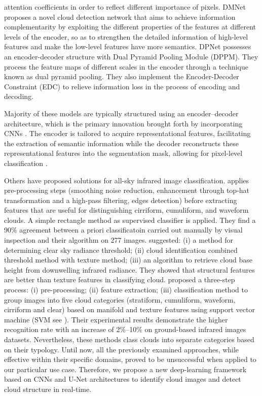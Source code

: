 \documentclass[amt, article]{copernicus}
\begin{document}
attention coefficients in order to reflect different importance of pixels. DMNet \citep{DMNet} proposes a novel cloud detection network that aims to achieve information complementarity by exploiting the different properties of the features at different levels of the encoder, so as to strengthen the detailed information of high-level features and make the low-level features have more semantics. DPNet \citep{DPNet} possesses an encoder-decoder structure with Dual Pyramid Pooling Module (DPPM). They process the feature maps of different scales in the encoder through a technique known as dual pyramid pooling. They also implement the Encoder-Decoder Constraint (EDC) to relieve information loss in the process of encoding and decoding.

Majority of these models are typically structured using an encoder–decoder architecture, which is the primary innovation brought forth by incorporating CNNs \citep{oshea2015introduction}. The encoder is tailored to acquire representational features, facilitating the extraction of semantic information while the decoder reconstructs these representational features into the segmentation mask, allowing for pixel-level classification \citep{badrinarayanan2017segnet, Alzubaidi2021ReviewOD}.

Others have proposed solutions for all-sky infrared image classification.
\citet{Liu2021} applies pre-processing steps (smoothing noise reduction, enhancement through top-hat transformation and a high-pass filtering, edges detection) before extracting features that are useful for distinguishing cirriform, cumuliform, and waveform clouds. A simple rectangle method as supervised classifier is applied. They find a 90\% agreement between a priori classificatoin carried out manually by visual inspection and their algorithm on 277 images. \citet{SUN2011278} suggested: (i) a method for determining clear sky radiance threshold; (ii) cloud identification combined threshold method with texture method; (iii) an algorithm to retrieve cloud base height from downwelling infrared radiance. They showed that structural features are better than texture features in classifying cloud. \citet{amt-11-5351-2018} proposed a three-step process: (i) pre-processing; (ii) feature extraction; (iii) classification method to group images into five cloud categories (stratiform, cumuliform, waveform, cirriform and clear) based on manifold and texture features using support vector machine (SVM see \citealt{cortes1995support}). Their experimental results demonstrate the higher recognition rate with an increase of 2\%–10\% on ground-based infrared images datasets. Nevertheless, these methods class clouds into separate categories based on their typology. Until now, all the previously examined approaches, while effective within their specific domains, proved to be unsuccessful when applied to our particular use case. Therefore, we propose a new deep-learning framework based on CNNs and U-Net architectures to identify cloud images and detect cloud structure in real-time.
\end{document}
